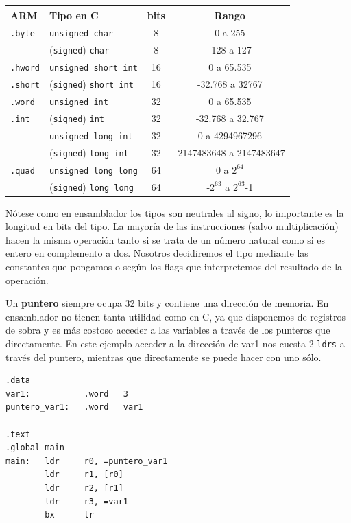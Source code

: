 \begin{descript}
\vspace{1cm}
\begin{center}
\begin{tabular}{|l|l|c|c|}\hline
 ARM & Tipo en C & bits & Rango \\ \hline
 {\tt .byte}  & {\tt unsigned char} & 8 & 0 a 255 \\
              & ({\tt signed}) {\tt char} & 8 & -128 a 127 \\ \hline
 {\tt .hword} & {\tt unsigned short int} & 16 &  0 a 65.535 \\
 {\tt .short} & ({\tt signed}) {\tt short int} & 16 & -32.768 a 32767 \\ \hline
 {\tt .word}  & {\tt unsigned int} & 32 & 0 a 65.535 \\
 {\tt .int}   & ({\tt signed}) {\tt int} &  32 & -32.768 a 32.767 \\
              & {\tt unsigned long int}  & 32 & 0 a 4294967296 \\ 
              & ({\tt signed}) {\tt long int} &  32 & -2147483648 a 2147483647 \\ \hline
 {\tt .quad}  & {\tt unsigned long long} & 64 &  0 a $2^{64}$ \\
              & ({\tt signed}) {\tt long long} & 64 & -$2^{63}$ a $2^{63}$-1 \\ \hline
\end{tabular}
\end{center}

Nótese como en ensamblador los tipos son neutrales al signo, lo importante
es la longitud en bits del tipo. La mayoría de las instrucciones (salvo
multiplicación) hacen la misma operación tanto si se trata de un número
natural como si es entero en complemento a dos. Nosotros decidiremos el tipo
mediante las constantes que pongamos o según los flags que interpretemos del
resultado de la operación.
\end{descript}


 Un {\bf puntero} siempre ocupa 32 bits y contiene
una dirección de memoria. En ensamblador no tienen tanta utilidad como en C,
ya que disponemos de registros de sobra y es más costoso acceder a
las variables a través de los punteros que directamente. En este ejemplo
acceder a la dirección de var1 nos cuesta 2 {\tt ldrs} a través del puntero,
mientras que directamente se puede hacer con uno sólo.


\begin{lstlisting}
.data
var1:           .word   3
puntero_var1:   .word   var1

.text
.global main
main:   ldr     r0, =puntero_var1
        ldr     r1, [r0]
        ldr     r2, [r1]
        ldr     r3, =var1
        bx      lr
\end{lstlisting}

